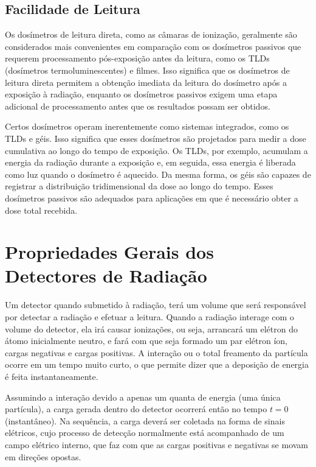 \documentclass[11pt,a4paper]{article}
\newcounter{exemplo}
\begin{document}
\subsection*{Facilidade de Leitura}

	Os dosímetros de leitura direta, como as câmaras de ionização, geralmente são considerados mais convenientes em comparação com os dosímetros passivos que requerem processamento pós-exposição antes da leitura, como os TLDs (dosímetros termoluminescentes) e filmes. Isso significa que os dosímetros de leitura direta permitem a obtenção imediata da leitura do dosímetro após a exposição à radiação, enquanto os dosímetros passivos exigem uma etapa adicional de processamento antes que os resultados possam ser obtidos.

	Certos dosímetros operam inerentemente como sistemas integrados, como os TLDs e géis. Isso significa que esses dosímetros são projetados para medir a dose cumulativa ao longo do tempo de exposição. Os TLDs, por exemplo, acumulam a energia da radiação durante a exposição e, em seguida, essa energia é liberada como luz quando o dosímetro é aquecido. Da mesma forma, os géis são capazes de registrar a distribuição tridimensional da dose ao longo do tempo. Esses dosímetros passivos são adequados para aplicações em que é necessário obter a dose total recebida.
	
	
\section{Propriedades Gerais dos Detectores de Radiação}

    Um detector quando submetido à radiação, terá um volume que será responsável por detectar a radiação e efetuar a leitura. Quando a radiação interage com o volume do detector, ela irá causar ionizações, ou seja, arrancará um elétron do átomo inicialmente neutro, e fará com que seja formado um par elétron íon, cargas negativas e cargas positivas. A interação ou o total freamento da partícula ocorre em um tempo muito curto, o que permite dizer que a deposição de energia é feita instantaneamente. 

    Assumindo a interação devido a apenas um quanta de energia (uma única partícula), a carga gerada dentro do detector ocorrerá então no tempo $t = 0$ (instantâneo). Na sequência, a carga deverá ser coletada na forma de sinais elétricos, cujo processo de detecção normalmente está acompanhado de um campo elétrico interno, que faz com que as cargas positivas e negativas se movam em direções opostas. 
\end{document}
